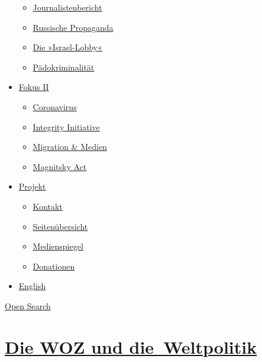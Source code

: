 \begin{itemize}
  \begin{itemize}
  \tightlist
  \item
    \href{https://swprs.org/bericht-eines-journalisten/}{Journalistenbericht}
  \item
    \href{https://swprs.org/russische-propaganda/}{Russische Propaganda}
  \item
    \href{https://swprs.org/die-israel-lobby-fakten-und-mythen/}{Die
    »Israel-Lobby«}
  \item
    \href{https://swprs.org/geopolitik-und-paedokriminalitaet/}{Pädokriminalität}
  \end{itemize}
\item
  \href{https://swprs.org/migration-und-medien/}{Fokus II}

  \begin{itemize}
  \tightlist
  \item
    \href{https://swprs.org/covid-19-hinweis-ii/}{Coronavirus}
  \item
    \href{https://swprs.org/die-integrity-initiative/}{Integrity
    Initiative}
  \item
    \href{https://swprs.org/migration-und-medien/}{Migration \& Medien}
  \item
    \href{https://swprs.org/der-fall-magnitsky/}{Magnitsky Act}
  \end{itemize}
\item
  \href{https://swprs.org/kontakt/}{Projekt}

  \begin{itemize}
  \tightlist
  \item
    \href{https://swprs.org/kontakt/}{Kontakt}
  \item
    \href{https://swprs.org/uebersicht/}{Seitenübersicht}
  \item
    \href{https://swprs.org/medienspiegel/}{Medienspiegel}
  \item
    \href{https://swprs.org/donationen/}{Donationen}
  \end{itemize}
\item
  \href{https://swprs.org/contact/}{English}
\end{itemize}

\protect\hyperlink{}{Open Search}

\hypertarget{die-woz-und-die-weltpolitik}{%
\section{\texorpdfstring{\href{https://swprs.org/2017/03/01/die-woz-und-die-weltpolitik/}{Die
WOZ und
die~Weltpolitik}}{Die WOZ und die~Weltpolitik}}\label{die-woz-und-die-weltpolitik}}

